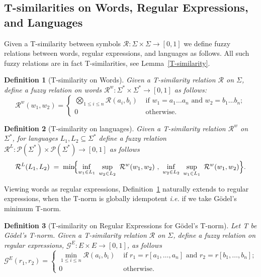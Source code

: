 \documentclass{article}
\def\ie{{\em i.e. }}
\newtheorem{definition}{Definition}[section]
\begin{document}
\subsection{T-similarities on Words, Regular Expressions, and Languages}
Given a T-similarity between symbols $\mathcal{R}:\Sigma \times \Sigma \rightarrow [0,1]$ we define fuzzy relations between words, regular expressions, and languages as follows. All such fuzzy relations are in fact T-similarities, see Lemma~\ref{T-similarity}.
\begin{definition}[T-similarity on Words]\label{def:Rw}Given a T-similarity relation $\mathcal R$ on $\Sigma$, define a fuzzy relation on words $\mathcal{R}^w:\Sigma^* \times \Sigma^* \rightarrow [0,1]$ as follows:$$\mathcal R^{w}(w_1,w_2) =\begin{cases}\bigotimes_{1\leq i\leq n}\mathcal R(a_i,b_i) &\mbox{ if } w_1=a_1\ldots a_n\mbox{ and }w_2 =b_1 \ldots b_n;
\\ 
0& \mbox{ otherwise. }
\end{cases}$$
\end{definition}
\begin{definition}[T-similarity on languages]\label{def:RL}
Given a T-similarity relation $\mathcal R^w$ on $\Sigma^*$, for languages $L_1,L_2\subseteq \Sigma^*$ define a fuzzy relation $\mathcal{R}^L:\mathcal P(\Sigma^*)\times \mathcal P(\Sigma^*)\to [0,1]$ as follows
\[
\mathcal{R}^L(L_1,L_2)\;=\;
\min\!\Bigl\{
\inf_{w_1\in L_1}\ \sup_{w_2\in L_2}\ \mathcal{R}^w(w_1,w_2)\ ,\
\inf_{w_2\in L_2}\ \sup_{w_1\in L_1}\ \mathcal{R}^w(w_1,w_2)
\Bigr\}.
\]
\end{definition}

Viewing words as regular expressions, Definition~\ref{def:Rw} naturally extends to regular expressions, when the T-norm is globally idempotent \ie if we take G\"odel's minimum T-norm.
\begin{definition}[T-similarity on Regular Expressions for G\"odel's T-norm] \label{def:Rexp}Let T be G\"odel's T-norm. Given a T-similarity relation $\mathcal R$ on $\Sigma$, define a fuzzy relation on regular expressions, $\mathcal{G}^{E}:E \times E \rightarrow [0,1]$, as follows
$$\mathcal G^{E}(r_1,r_2) =\begin{cases}\min_{1\leq i\leq n}\mathcal R(a_i,b_i) &\mbox{ if } r_1=r[a_1,\ldots,a_n]\mbox{ and }r_2 =r[b_1,\ldots,b_n];
\\ 
0& \mbox{ otherwise. }
\end{cases}$$
\end{definition}
\end{document}

